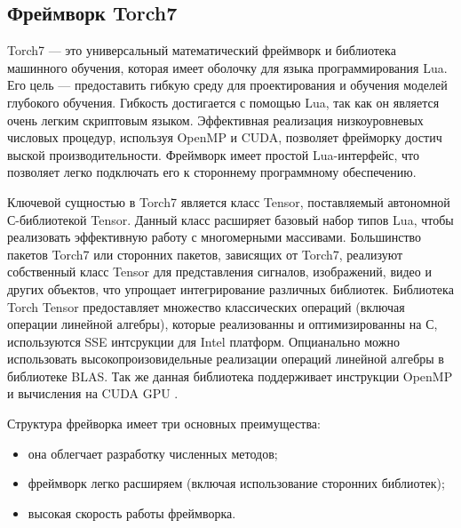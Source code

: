 \documentclass[a4paper,english,russian]{G2-105}
\begin{document}
\subsection{Фреймворк Torch7} \ttl
\par Torch7 --- это универсальный математический фреймворк и библиотека машинного обучения, которая имеет оболочку для языка программирования Lua. Его цель --- предоставить гибкую среду для проектирования и обучения моделей глубокого обучения. Гибкость достигается с помощью Lua, так как он является очень легким скриптовым языком. Эффективная реализация низкоуровневых числовых процедур, используя OpenMP и CUDA, позволяет фрейморку достич выской производительности. Фреймворк имеет простой Lua-интерфейс, что позволяет легко подключать его к стороннему программному обеспечению.
\par Ключевой сущностью в Torch7 является класс Tensor, поставляемый автономной С-библиотекой Tensor. Данный класс расширяет базовый набор типов Lua, чтобы реализовать эффективную работу с многомерными массивами. Большинство пакетов Torch7 или сторонних пакетов, зависящих от Torch7, реализуют собственный класс Tensor для представления сигналов, изображений, видео и других объектов, что упрощает интегрирование различных библиотек. Библиотека Torch Tensor предоставляет множество классических операций (включая операции линейной алгебры), которые реализованны и оптимизированны на С, используются SSE интсрукции для Intel платформ. Опцианально можно использовать высокопроизовидельные реализации операций линейной алгебры в библиотеке BLAS. Так же данная библиотека поддерживает инструкции OpenMP и вычисления на CUDA GPU \cite{13}.
\par Структура фрейворка имеет три основных преимущества:
\begin{itemize}
\item она облегчает разработку численных методов;
\item фреймворк легко расширяем (включая использование сторонних библиотек);
\item высокая скорость работы фреймворка.
\end{itemize}
\end{document}
